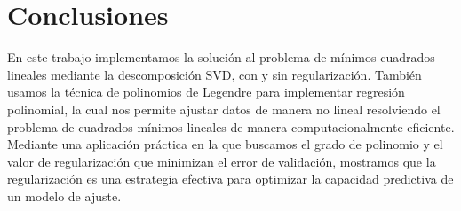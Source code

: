 \documentclass{article}
\begin{document}
\clearpage
\section{Conclusiones} \label{sec:conclusiones}

En este trabajo implementamos la solución al problema de mínimos cuadrados lineales mediante la descomposición SVD, con y sin regularización. También usamos la técnica de polinomios de Legendre para implementar regresión polinomial, la cual nos permite ajustar datos de manera no lineal resolviendo el problema de cuadrados mínimos lineales de manera computacionalmente eficiente. Mediante una aplicación práctica en la que buscamos el grado de polinomio y el valor de regularización que minimizan el error de validación, mostramos que la regularización es una estrategia efectiva para optimizar la capacidad predictiva de un modelo de ajuste.









\end{document}

